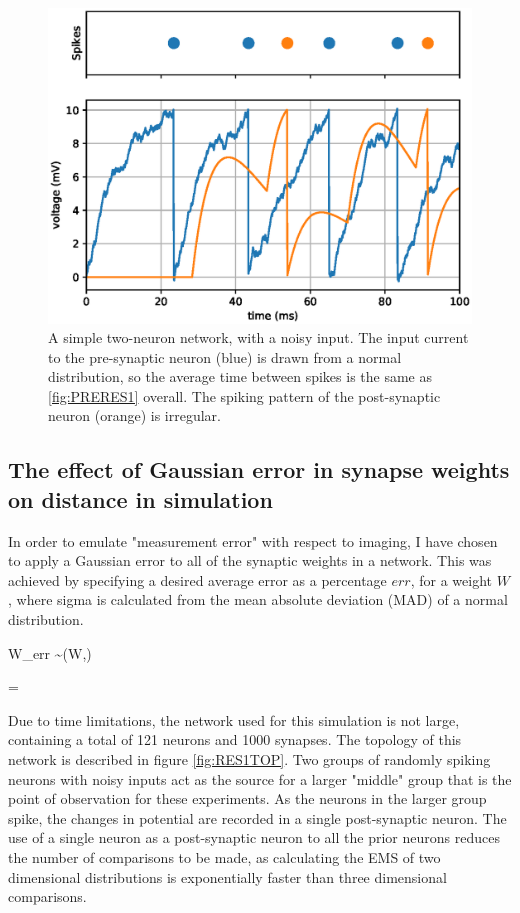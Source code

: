 \begin{figure}[h!]
    \centering
    \includegraphics[width=0.65\linewidth]{figures/graphs/twospikingneuronsdelaynoise.eps}
    \caption[A simple two-neuron network with noise]{A simple two-neuron network, with a noisy input. The input current to the pre-synaptic neuron (blue) is drawn from a normal distribution, so the average time between spikes is the same as \ref{fig:PRERES1} overall. The spiking pattern of the post-synaptic neuron (orange) is irregular.}
    \label{fig:PRERES2}
\end{figure}
\FloatBarrier

\subsection{The effect of Gaussian error in synapse weights on distance in simulation}

In order to emulate "measurement error" with respect to imaging, I have chosen
to apply a Gaussian error to all of the synaptic weights in a network. This was
achieved by specifying a desired average error as a percentage $err$, for a
weight $W$, where sigma is calculated from the mean absolute deviation (MAD) of
a normal distribution.

\begin{myequation}
    W_{err} \sim {}(W,\sigma)
\end{myequation}
\begin{myequation}
    \sigma = 
\end{myequation}

Due to time limitations, the network used for this simulation is not large,
containing a total of 121 neurons and 1000 synapses. The topology of this
network is described in figure \ref{fig:RES1TOP}. Two groups of randomly spiking
neurons with noisy inputs act as the source for a larger "middle" group that is
the point of observation for these experiments. As the neurons in the larger
group spike, the changes in potential are recorded in a single post-synaptic
neuron. The use of a single neuron as a post-synaptic neuron to all the prior
neurons reduces the number of comparisons to be made, as calculating the EMS of
two dimensional distributions is exponentially faster than three dimensional
comparisons. 

